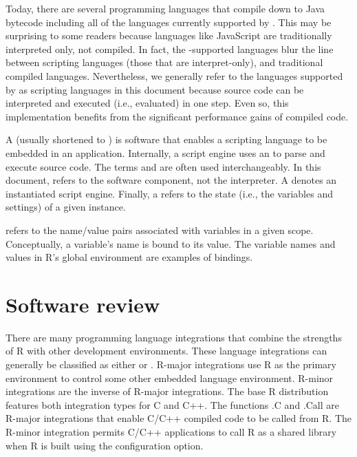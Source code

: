 Today, there are several programming languages that compile down to Java bytecode including all of the languages currently supported by . This may be surprising to some readers because languages like JavaScript are traditionally interpreted only, not compiled. In fact, the -supported languages blur the line between scripting languages (those that are interpret-only), and traditional compiled languages. Nevertheless, we generally refer to the languages supported by  as scripting languages in this document because source code can be interpreted and executed (i.e., evaluated) in one step. Even so, this implementation benefits from the significant performance gains of compiled code.

A  (usually shortened to ) is software that enables a scripting language to be embedded in an application. Internally, a script engine uses an  to parse and execute source code. The terms  and  are often used interchangeably. In this document,  refers to the software component, not the interpreter. A  denotes an instantiated script engine. Finally, a  refers to the state (i.e., the variables and settings) of a given instance.

 refers to the name/value pairs associated with variables in a given scope. Conceptually, a variable's name is bound to its value. The variable names and values in R's global environment are examples of bindings.

\hypertarget{softwarereview}{\section{Software review}}

There are many programming language integrations that combine the strengths of R with other development environments. These language integrations can generally be classified as either  or . R-major integrations use R as the primary environment to control some other embedded language environment. R-minor integrations are the inverse of R-major integrations. The base R distribution features both integration types for C and C++. The functions .C and .Call are R-major integrations that enable C/C++ compiled code to be called from R. The R-minor integration permits C/C++ applications to call R as a shared library when R is built using the  configuration option.

